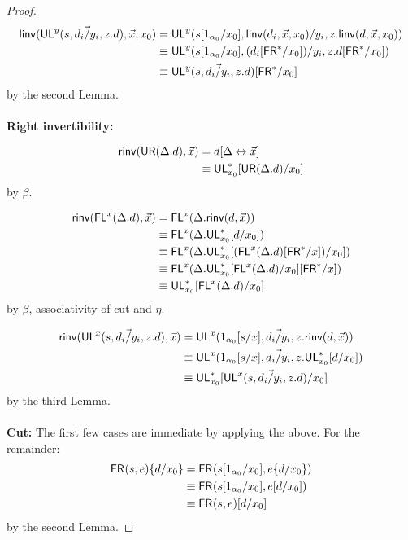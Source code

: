 \begin{proof}
\begin{align*}
\mathsf{linv}(\mathsf{UL}^{y}_{}(s,\vec{d_i/y_i},z.d),\vec{x},x_0) 
&= \mathsf{UL}^{y}_{}(s[1_{\alpha_0}/x_0],\mathsf{linv}(d_i,\vec{x},x_0)/y_i,z.\mathsf{linv}(d,\vec{x},x_0)) \\
&\equiv \mathsf{UL}^{y}_{}(s[1_{\alpha_0}/x_0],(d_i[\mathsf{FR}^*/x_0])/y_i,z.d[\mathsf{FR}^*/x_0]) \\
&\equiv \mathsf{UL}^{y}_{}(s,\vec{d_i/y_i},z.d)[\mathsf{FR}^*/x_0]
\end{align*}
by the second Lemma.
\\~\\
\textbf{Right invertibility:}

\begin{align*}
\mathsf{rinv}(\mathsf{UR}(\Delta.d),\vec{x}) &= d[\Delta \leftrightarrow \vec{x}]\\
&\equiv \mathsf{UL}^*_{x_0}[\mathsf{UR}(\Delta.d)/x_0]
\end{align*}
by $\beta$.

\begin{align*}
\mathsf{rinv}(\mathsf{FL}^{x}(\Delta.d),\vec{x}) 
&= \mathsf{FL}^{x}(\Delta.\mathsf{rinv}(d,\vec{x})) \\
&\equiv \mathsf{FL}^{x}(\Delta.\mathsf{UL}^*_{x_0}[d/x_0]) \\
&\equiv \mathsf{FL}^{x}(\Delta.\mathsf{UL}^*_{x_0}[(\mathsf{FL}^{x}(\Delta.d)[\mathsf{FR}^*/x])/x_0]) \\
&\equiv \mathsf{FL}^{x}(\Delta.\mathsf{UL}^*_{x_0}[\mathsf{FL}^{x}(\Delta.d)/x_0][\mathsf{FR}^*/x]) \\
&\equiv \mathsf{UL}^*_{x_0}[\mathsf{FL}^{x}(\Delta.d)/x_0]
\end{align*}
by $\beta$, associativity of cut and $\eta$.

\begin{align*}
\mathsf{rinv}(\mathsf{UL}^{x}_{}(s,\vec{d_i/y_i},z.d),\vec{x}) 
&= \mathsf{UL}^{x}_{}(1_{\alpha_0}[s/x],\vec{d_i/y_i},z.\mathsf{rinv}(d,\vec{x}))\\
&\equiv \mathsf{UL}^{x}_{}(1_{\alpha_0}[s/x],\vec{d_i/y_i},z.\mathsf{UL}^*_{x_0}[d/x_0])\\
&\equiv \mathsf{UL}^*_{x_0}[\mathsf{UL}^{x}_{}(s,\vec{d_i/y_i},z.d)/x_0]
\end{align*}
by the third Lemma.
\\~\\
\textbf{Cut:} The first few cases are immediate by applying the above. For the remainder:
\begin{align*}
\mathsf{FR}_{}(s,e)\{d/x_0\}
&= {\mathsf{FR}_{}(s[1_{\alpha_0}/x_0],e\{d/x_0\})}\\
&\equiv {\ensuremath{\mathsf{FR}_{}(s[1_{\alpha_0}/x_0],e[d/x_0])}}\\
&\equiv \mathsf{FR}_{}(s,e)[d/x_0]
\end{align*}
by the second Lemma.


\end{proof}
